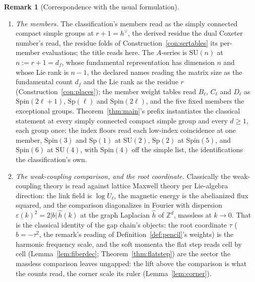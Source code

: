 \documentclass[11pt]{article}
\theoremstyle{definition}
\newtheorem{remark}{Remark}
\begin{document}
\begin{remark}[Correspondence with the usual formulation]
\begin{enumerate}[leftmargin=2em,itemsep=3pt]
\item \emph{The members.} The classification's members read as
the simply connected compact simple groups at $r+1=h^\vee$, the
derived residue
the dual Coxeter number's read, the residue folds of
Construction~\ref{con:sertables} its per-member evaluations; the
title reads here. The $A$-series is $\mathrm{SU}(n)$ at
$n:=r+1=d_f$, whose fundamental representation has dimension $n$
and whose Lie rank is $n-1$, the declared names reading the
matrix size as the fundamental count $d_f$ and the Lie rank as
the residue $r$ (Construction~\ref{con:places}); the member
weight tables read $B_\ell$, $C_\ell$ and $D_\ell$ as
$\mathrm{Spin}(2\ell{+}1)$, $\mathrm{Sp}(\ell)$ and
$\mathrm{Spin}(2\ell)$, and the five fixed members the
exceptional groups. Theorem~\ref{thm:main}'s prefix instantiates
the classical statement at every simply connected compact simple
group and every
$d\ge1$, each group once: the index floors read each low-index
coincidence at one member, $\mathrm{Spin}(3)$ and
$\mathrm{Sp}(1)$ at $\mathrm{SU}(2)$, $\mathrm{Sp}(2)$ at
$\mathrm{Spin}(5)$, and $\mathrm{Spin}(6)$ at $\mathrm{SU}(4)$,
with
$\mathrm{Spin}(4)$ off the simple list, the identifications the
classification's own.

\item \emph{The weak-coupling comparison, and the root coordinate.}
Classically the weak-coupling theory is read against lattice Maxwell
theory per Lie-algebra direction: the link field is $\log U_\ell$, the
magnetic energy is the abelianized flux squared, and the comparison
diagonalizes in Fourier with dispersion
$\varepsilon(k)^2=2|b|\,\hat h(k)$ at the graph Laplacian $\hat h$ of
$\mathbb Z^d$, massless at $k\to0$. That is the classical identity of the
gap chain's objects: the root coordinate $\tau$ ($b=-\tau^2$, the
remark's reading of Definition~\ref{def:pencil}'s weights) is the harmonic frequency scale, and the
soft momenta the flat step reads cell by cell
(Lemma~\ref{lem:fiberdec}; Theorem~\ref{thm:flatstep}) are the sector
the massless comparison leaves ungapped: the lift above the comparison is
what the counts read, the corner scale its ruler
(Lemma~\ref{lem:corner}).


\end{enumerate}
\end{remark}
\end{document}
